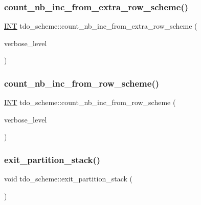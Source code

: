 \subsubsection{\texorpdfstring{count\+\_\+nb\+\_\+inc\+\_\+from\+\_\+extra\+\_\+row\+\_\+scheme()}{count\_nb\_inc\_from\_extra\_row\_scheme()}}
{\footnotesize\ttfamily \mbox{\hyperlink{galois_8h_a09fddde158a3a20bd2dcadb609de11dc}{I\+NT}} tdo\+\_\+scheme\+::count\+\_\+nb\+\_\+inc\+\_\+from\+\_\+extra\+\_\+row\+\_\+scheme (\begin{DoxyParamCaption}\item[{\mbox{\hyperlink{galois_8h_a09fddde158a3a20bd2dcadb609de11dc}{I\+NT}}}]{verbose\+\_\+level }\end{DoxyParamCaption})}

\mbox{\label{classtdo__scheme_a04eeda9bbded74e3a76a49e9798c11eb}} 
\subsubsection{\texorpdfstring{count\+\_\+nb\+\_\+inc\+\_\+from\+\_\+row\+\_\+scheme()}{count\_nb\_inc\_from\_row\_scheme()}}
{\footnotesize\ttfamily \mbox{\hyperlink{galois_8h_a09fddde158a3a20bd2dcadb609de11dc}{I\+NT}} tdo\+\_\+scheme\+::count\+\_\+nb\+\_\+inc\+\_\+from\+\_\+row\+\_\+scheme (\begin{DoxyParamCaption}\item[{\mbox{\hyperlink{galois_8h_a09fddde158a3a20bd2dcadb609de11dc}{I\+NT}}}]{verbose\+\_\+level }\end{DoxyParamCaption})}

\mbox{\label{classtdo__scheme_a74620eccf6df140397430fc5487de0cd}} 
\subsubsection{\texorpdfstring{exit\+\_\+partition\+\_\+stack()}{exit\_partition\_stack()}}
{\footnotesize\ttfamily void tdo\+\_\+scheme\+::exit\+\_\+partition\+\_\+stack (\begin{DoxyParamCaption}{ }\end{DoxyParamCaption})}


